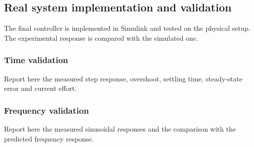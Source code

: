 \subsection{Real system implementation and validation}

The final controller is implemented in Simulink and tested on the physical setup. The experimental response is compared with the simulated one.

\subsubsection{Time validation}

Report here the measured step response, overshoot, settling time, steady-state error and current effort.

\subsubsection{Frequency validation}

Report here the measured sinusoidal responses and the comparison with the predicted frequency response.
